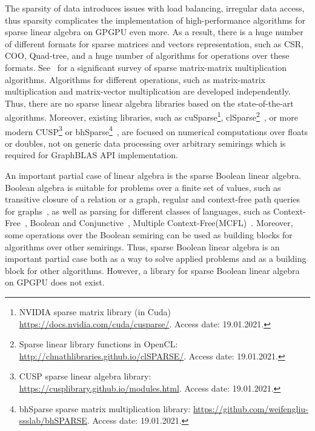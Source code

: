 The sparsity of data introduces issues with load balancing, irregular data access, thus sparsity complicates the implementation of high-performance algorithms for sparse linear algebra on GPGPU even more.
As a result, there is a huge number of different formats for sparse matrices and vectors representation, such as CSR, COO, Quad-tree, and a huge number of algorithms for operations over these formats.
See~\cite{Gao2020ASS} for a significant survey of sparse matrix-matrix multiplication algorithms.
Algorithms for different operations, such as matrix-matrix multiplication and matrix-vector multiplication are developed independently.
Thus, there are no sparse linear algebra libraries based on the state-of-the-art algorithms.
Moreover, existing libraries, such as cuSparse\footnote{NVIDIA sparse matrix library (in Cuda) \url{https://docs.nvidia.com/cuda/cusparse/}. Access date: 19.01.2021.}, clSparse\footnote{Sparse linear library functions in OpenCL: \url{http://clmathlibraries.github.io/clSPARSE/}. Access date: 19.01.2021.}~\cite{10.1145/2909437.2909442}, or more modern CUSP\footnote{CUSP sparse linear algebra library: \url{https://cusplibrary.github.io/modules.html}. Access date: 19.01.2021.} or bhSparse\footnote{bhSparse sparse matrix multiplication library: \url{https://github.com/weifengliu-ssslab/bhSPARSE}. Access date: 19.01.2021.}~\cite{10.1016/j.jpdc.2015.06.010}, are focused on numerical computations over floats or doubles, not on generic data processing over arbitrary semirings which is required for GraphBLAS API implementation.

An important partial case of linear algebra is the sparse Boolean linear algebra.
Boolean algebra is suitable for problems over a finite set of values, such as transitive closure of a relation or a graph, regular and context-free path queries for graphs~\cite{10.1145/3210259.3210264}, as well as parsing for different classes of languages, such as Context-Free~\cite{10.1016/S0022-0000(75)80046-8}, Boolean and Conjunctive~\cite{OKHOTIN2014101}, Multiple Context-Free(MCFL)~\cite{10.5555/972525.972527}.
Moreover, some operations over the Boolean semiring can be used as building blocks for algorithms over other semirings.
Thus, sparse Boolean linear algebra is an important partial case both as a way to solve applied problems and as a building block for other algorithms.
However, a library for sparse Boolean linear algebra on GPGPU does not exist.

